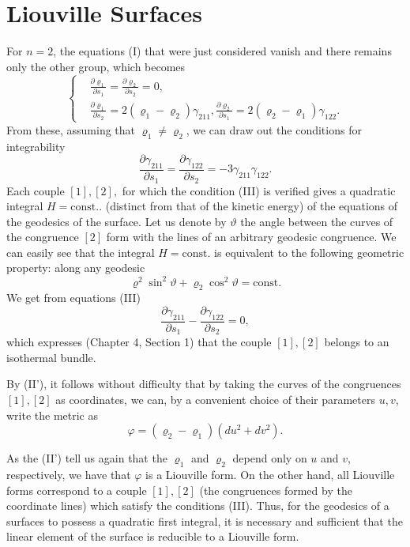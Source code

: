 \documentclass{book}
\begin{document}
\section{Liouville Surfaces}

For $n=2$, the equations (I) that were just considered vanish and there remains only the other group, which becomes
\begin{equation*}
\begin{cases}
&\displaystyle\frac{\partial\varrho_1}{\partial s_1}=\frac{\partial\varrho_2}{\partial s_2}=0,\\
&\displaystyle\frac{\partial\varrho_1}{\partial s_2}=2(\varrho_1-\varrho_2)\gamma_{211}, \frac{\partial\varrho_2}{\partial s_1}=2(\varrho_2-\varrho_1)\gamma_{122}.
\end{cases}
\tag{II'}
\end{equation*}
From these, assuming that $\varrho_1\neq\varrho_2$, we can draw out the conditions for integrability
\begin{equation*}
\frac{\partial\gamma_{211}}{\partial s_1}=\frac{\partial\gamma_{122}}{\partial s_2}=-3\gamma_{211}\gamma_{122}.
\tag{III}
\end{equation*}
Each couple $[1],[2],$ for which the condition (III) is verified gives a quadratic integral $H=\text{const.}$. (distinct from that of the kinetic energy) of the equations of the geodesics of the surface. Let us denote by $\vartheta$ the angle between the curves of the congruence $[2]$ form with the lines of an arbitrary geodesic congruence. We can easily see that the integral $H=\text{const.}$ is equivalent to the following geometric property: along any geodesic
$$\varrho^2\sin^2\vartheta+\varrho_2\cos^2\vartheta=\text{const.}$$
We get from equations (III)
$$\frac{\partial\gamma_{211}}{\partial s_1}-\frac{\partial\gamma_{122}}{\partial s_2}=0,$$
which expresses (Chapter 4, Section 1) that the couple $[1],[2]$ belongs to an isothermal bundle.

By (II'), it follows without difficulty that by taking the curves of the congruences $[1],[2]$ as coordinates, we can, by a convenient choice of their parameters $u,v$, write the metric as
$$\varphi=(\varrho_2-\varrho_1)(du^2+dv^2).$$

As the (II') tell us again that the $\varrho_1$ and $\varrho_2$ depend only on $u$ and $v$, respectively, we have that $\varphi$ is a Liouville form. On the other hand, all Liouville forms correspond to a couple $[1],[2]$ (the congruences formed by the coordinate lines) which satisfy the conditions (III). Thus, for the geodesics of a surfaces to possess a quadratic first integral, it is necessary and sufficient that the linear element of the surface is reducible to a Liouville form. 
\end{document}
